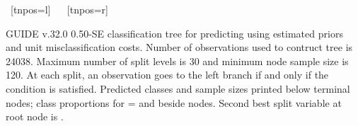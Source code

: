 \documentclass{article}
\begin{document}
\begin{center}
{{{{{ }{
    ~[tnpos=l]{}
    ~{}
   }
   }
   }
    ~[tnpos=r]{}
    ~{}
 }
 }
 \end{center}
GUIDE v.32.0  0.50-SE
classification tree for predicting \texttt{} using
estimated priors
and unit misclassification costs.
 Number of observations used to contruct tree is 24038.
 Maximum number of split levels is 30 and minimum node sample size is 120.
At each split, an observation goes to the left branch 
 if and only if the condition is satisfied.
Predicted classes and sample sizes printed below terminal nodes;
 class proportions for \texttt{} =
 \texttt{} and \texttt{} beside nodes.
Second best split variable at root node is \texttt{}.
 
\end{document}
